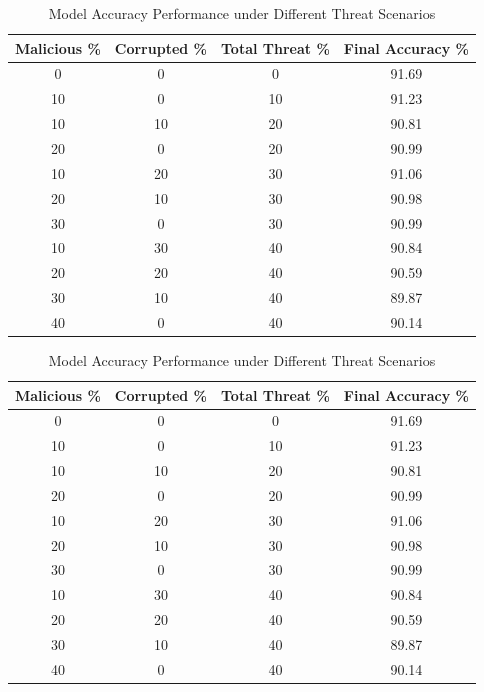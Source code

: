 
\begin{table}[htbp]
\centering
\caption{Model Accuracy Performance under Different Threat Scenarios}
\label{tab:dagtrust_accuracy}
\begin{tabular}{|c|c|c|c|}
\hline
\textbf{Malicious \%} & \textbf{Corrupted \%} & \textbf{Total Threat \%} & \textbf{Final Accuracy \%} \\
\hline
0 & 0 & 0 & 91.69 \\
\hline
10 & 0 & 10 & 91.23 \\
\hline
10 & 10 & 20 & 90.81 \\
\hline
20 & 0 & 20 & 90.99 \\
\hline
10 & 20 & 30 & 91.06 \\
\hline
20 & 10 & 30 & 90.98 \\
\hline
30 & 0 & 30 & 90.99 \\
\hline
10 & 30 & 40 & 90.84 \\
\hline
20 & 20 & 40 & 90.59 \\
\hline
30 & 10 & 40 & 89.87 \\
\hline
40 & 0 & 40 & 90.14 \\
\hline
\end{tabular}
\end{table}

\begin{table}[htbp]
\centering
\caption{Model Accuracy Performance under Different Threat Scenarios}
\label{tab:dagtrust_accuracy_booktabs}
\begin{tabular}{cccc}
\toprule
\textbf{Malicious \%} & \textbf{Corrupted \%} & \textbf{Total Threat \%} & \textbf{Final Accuracy \%} \\
\midrule
0 & 0 & 0 & 91.69 \\
10 & 0 & 10 & 91.23 \\
10 & 10 & 20 & 90.81 \\
20 & 0 & 20 & 90.99 \\
10 & 20 & 30 & 91.06 \\
20 & 10 & 30 & 90.98 \\
30 & 0 & 30 & 90.99 \\
10 & 30 & 40 & 90.84 \\
20 & 20 & 40 & 90.59 \\
30 & 10 & 40 & 89.87 \\
40 & 0 & 40 & 90.14 \\
\bottomrule
\end{tabular}
\end{table}

